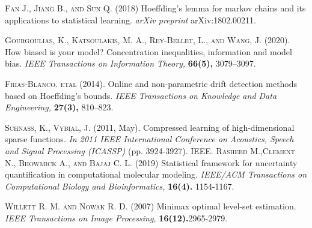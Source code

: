 \documentclass[journal]{IEEEtran}
\begin{document}
\begin{thebibliography}{16}
\textsc{Fan J., Jiang B., and Sun Q.} (2018)
Hoeffding's lemma for markov chains and its applications to statistical learning.
\textit{arXiv preprint } arXiv:1802.00211.

\textsc{Gourgoulias, K., Katsoulakis, M. A., Rey-Bellet, L., and Wang, J.} (2020). How biased is your model? Concentration inequalities, information and model bias. \textit{IEEE Transactions on Information Theory,}\textbf{ 66(5),} 3079--3097.

\textsc{Frias-Blanco. etal} (2014). Online and non-parametric drift detection methods based on Hoeffding's bounds. \textit{IEEE Transactions on Knowledge and Data Engineering,}\textbf{ 27(3),} 810--823.

\textsc{Schnass, K.,  Vybial, J.} (2011, May). Compressed learning of high-dimensional sparse functions. \textit{In 2011 IEEE International Conference on Acoustics, Speech and Signal Processing (ICASSP)} (pp. 3924-3927). IEEE.
\textsc{Rasheed M.,Clement N., Bhowmick A., and Bajaj C. L.} (2019)
Statistical framework for uncertainty quantification in computational molecular modeling.
\textit{IEEE/ACM Transactions on Computational Biology and Bioinformatics,}\textbf{ 16(4).} 1154-1167.

\textsc{Willett R. M. and Nowak R. D.} (2007)
Minimax optimal level-set estimation.
\textit{IEEE Transactions on Image Processing,}\textbf{ 16(12).}2965-2979.
\end{thebibliography}
\end{document}
